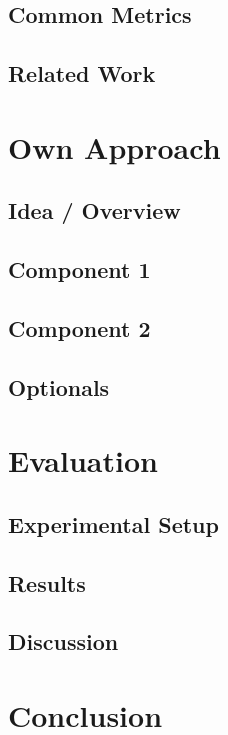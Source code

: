 \documentclass[%
  a4paper,fontsize=11pt,abstract=on,%
  twoside,BCOR=19mm,%
]{scrreprt}
\begin{document}
\lipsum[1-3]


\section{Common Metrics}\label{sec:metrics}
\lipsum[1-3]
\section{Related Work}\label{sec:relwork}
\lipsum[1-3]



\chapter{Own Approach}\label{ch:ownApproach}
\lipsum[1]
\section{Idea / Overview}
\lipsum[1-3]
\section{Component 1}
\lipsum[1-3]
\section{Component 2}
\lipsum[1-3]
\section{Optionals}
\lipsum[1-3]



\chapter{Evaluation}\label{ch:eval}
\lipsum[1]
\section{Experimental Setup}
\lipsum[1-3]
\section{Results}
\lipsum[1-3]
\section{Discussion}
\lipsum[1-3]



\chapter{Conclusion}\label{ch:conclusion}
\lipsum[1]
\end{document}
